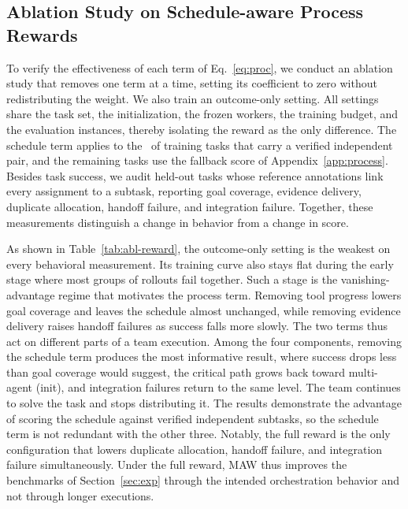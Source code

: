 \subsection{Ablation Study on Schedule-aware Process Rewards}
\label{sec:abl-reward}

To verify the effectiveness of each term of Eq.~\ref{eq:proc}, we conduct an ablation study that removes one term at a time, setting its coefficient to zero without redistributing the weight.
We also train an outcome-only setting.
All settings share the task set, the initialization, the frozen workers, the training budget, and the evaluation instances, thereby isolating the reward as the only difference.
The schedule term applies to the \fillin\ of training tasks that carry a verified independent pair, and the remaining tasks use the fallback score of Appendix~\ref{app:process}.
Besides task success, we audit held-out tasks whose reference annotations link every assignment to a subtask, reporting goal coverage, evidence delivery, duplicate allocation, handoff failure, and integration failure.
Together, these measurements distinguish a change in behavior from a change in score.



As shown in Table~\ref{tab:abl-reward}, the outcome-only setting is the weakest on every behavioral measurement.
Its training curve also stays flat during the early stage where most groups of rollouts fail together.
Such a stage is the vanishing-advantage regime that motivates the process term.
Removing tool progress lowers goal coverage and leaves the schedule almost unchanged, while removing evidence delivery raises handoff failures as success falls more slowly.
The two terms thus act on different parts of a team execution.
Among the four components, removing the schedule term produces the most informative result, where success drops less than goal coverage would suggest, the critical path grows back toward multi-agent (init), and integration failures return to the same level.
The team continues to solve the task and stops distributing it.
The results demonstrate the advantage of scoring the schedule against verified independent subtasks, so the schedule term is not redundant with the other three.
Notably, the full reward is the only configuration that lowers duplicate allocation, handoff failure, and integration failure simultaneously.
Under the full reward, MAW thus improves the benchmarks of Section~\ref{sec:exp} through the intended orchestration behavior and not through longer executions.

